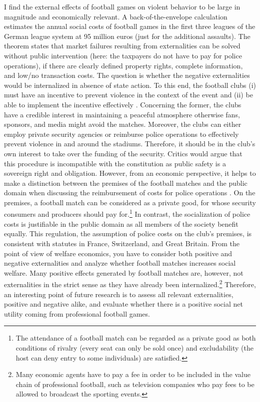 I find the external effects of football games on violent behavior to be large in magnitude and economically relevant. A back-of-the-envelope calculation estimates the annual social costs of football games in the first three leagues of the German league system at 95 million euros (just for the additional assaults). The \cite{coase1960problem} theorem states that market failures resulting from externalities can be solved without public intervention (here: the taxpayers do not have to pay for police operations), if there are clearly defined property rights, complete information, and low/no transaction costs. The question is whether the negative externalities would be internalized in absence of state action. To this end, the football clubs (i) must have an incentive to prevent violence in the context of the event and (ii) be able to implement the incentive effectively \citep{daumann2012}. Concerning the former, the clubs have a credible interest in maintaining a peaceful atmosphere otherwise fans, sponsors, and media might avoid the matches. Moreover, the clubs can either employ private security agencies or reimburse police operations to effectively prevent violence in and around the stadiums. Therefore, it should be in the club's own interest to take over the funding of the security. Critics would argue that this procedure is incompatible with the constitution as public safety is a sovereign right and obligation. However, from an economic perspective, it helps to make a distinction between the premises of the football matches and the public domain when discussing the reimbursement of costs for police operations \citep{mause2020}. On the premises, a football match can be considered as a private good, for whose security consumers and producers should pay for.\footnote{The attendance of a football match can be regarded as a private good as both conditions of rivalry (every seat can only be sold once) and excludability (the host can deny entry to some individuals) are satisfied.} In contrast, the socialization of police costs is justifiable in the public domain as all members of the society benefit equally. This regulation, the assumption of police costs on the club's premises, is consistent with statutes in France, Switzerland, and Great Britain. From the point of view of welfare economics, you have to consider both positive and negative externalities and analyze whether football matches increases social welfare. Many positive effects generated by football matches are, however, not externalities in the strict sense as they have already been internalized.\footnote{Many economic agents have to pay a fee in order to be included in the value chain of professional football, such as television companies who pay fees to be allowed to broadcast the sporting events.} Therefore, an interesting point of future research is to assess all relevant externalities, positive and negative alike, and evaluate whether there is a positive social net utility coming from professional football games. 
